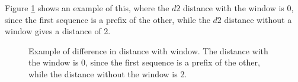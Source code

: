 Figure \ref{fig:d2_window_example} shows an example of this, where the $d2$
distance with the window is 0, since the first sequence is a prefix of the
other, while the $d2$ distance without a window gives a distance of 2.

\begin{figure}[H]
\centering
{}
\caption{Example of difference in distance with window. The distance with the
  window is 0, since the first sequence is a prefix of the other, while the
  distance without the window is 2.}
\label{fig:d2_window_example}
\end{figure}
